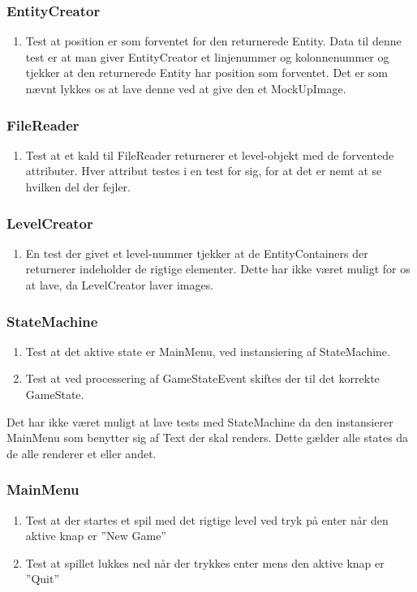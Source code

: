    \subsubsection{EntityCreator}
      \begin{enumerate}
         \item Test at position er som forventet for den returnerede Entity. Data til denne test er at man giver EntityCreator et linjenummer og kolonnenummer og tjekker at den returnerede Entity har position som forventet. Det er som nævnt lykkes os at lave denne ved at give den et MockUpImage. 
      \end{enumerate}
   \subsubsection{FileReader}
      \begin{enumerate}
         \item Test at et kald til FileReader returnerer et level-objekt med de forventede attributer. Hver attribut testes i en test for sig, for at det er nemt at se hvilken del der fejler.
      \end{enumerate}
   \subsubsection{LevelCreator}
      \begin{enumerate}
         \item En test der givet et level-nummer tjekker at de EntityContainers der returnerer indeholder de rigtige elementer. Dette har ikke været muligt for os at lave, da LevelCreator laver images.
      \end{enumerate}
   \subsubsection{StateMachine}
      \begin{enumerate}
         \item Test at det aktive state er MainMenu, ved instansiering af StateMachine.
         \item Test at ved processering af GameStateEvent skiftes der til det korrekte GameState.
      \end{enumerate}
      Det har ikke været muligt at lave tests med StateMachine da den instansierer MainMenu som benytter sig af Text der skal renders. Dette gælder alle states da de alle renderer et eller andet.
   \subsubsection{MainMenu}
      \begin{enumerate}
         \item Test at der startes et spil med det rigtige level ved tryk på enter når den aktive knap er ''New Game''
         \item Test at spillet lukkes ned når der trykkes enter mens den aktive knap er ''Quit''
      \end{enumerate}
